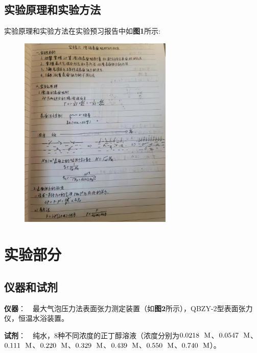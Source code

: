 \documentclass[12pt]{article}
\begin{document}
			\subsection{实验原理和实验方法}
				实验原理和实验方法在实验预习报告中如\textbf{图1}所示: \par
		\begin{figure}[h]
			\centering
			\includegraphics[width=0.65\textwidth]{1.png}
		\end{figure}

	     
    \section{实验部分}

    	\subsection{仪器和试剂}
		\textbf{仪器}：\ \  最大气泡压力法表面张力测定装置（如\textbf{图2}所示），QBZY-2型表面张力仪，恒温水浴装置。\par
		\textbf{试剂}：\ \  纯水，$8$种不同浓度的正丁醇溶液（浓度分别为$0.0218\ \ {\rm M}$、$0.0547\ \ {\rm M}$、$0.111\ \ {\rm M}$、$0.220\ \ {\rm M}$、$0.329\ \ {\rm M}$、$0.439\ \ {\rm M}$、$0.550\ \ {\rm M}$、$0.740\ \ {\rm M}$）。
			
\end{document}
